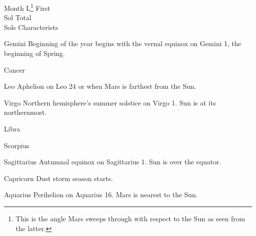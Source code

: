 {
    \bTABLE[split=repeat,option=stretch]
    \setupTABLE[column][5]
        [width=.52\textwidth,
        align=yes]
    \setupTABLE[row][each][align=center]
    \setupTABLE[5][1][align=center]

\bTABLEhead
    \bTR[bottomframe=on]
      \bTH  Month \eTH
      \bTH  L\footnote{This is the angle Mars sweeps through with respect to the Sun as seen from the latter.} \eTH
      \bTH  First\\Sol \eTH
      \bTH  Total\\Sols \eTH
      \bTH  Characterists \eTH
    \eTR
\eTABLEhead

\bTABLEbody
    \bTR
      \bTC Gemini \eTC
      \bTC \math{[0^{\circ}, 30^{\circ})}\eTC
       \eTC
       \eTC
      \bTC Beginning of the year begins with the vernal equinox on Gemini 1, the beginning of Spring.\eTC
    \eTR
    
    \bTR
      \bTC Cancer \eTC
      \bTC \math{[30^{\circ}, 60^{\circ})} \eTC
       \eTC
       \eTC
      \bTC  \eTC
    \eTR
    
    \bTR
      \bTC Leo \eTC
      \bTC \math{[60^{\circ}, 90^{\circ})} \eTC
       \eTC
       \eTC
      \bTC Aphelion on Leo 24 or when Mars is farthest from the Sun.\eTC
    \eTR
    
    \bTR
      \bTC Virgo \eTC
      \bTC \math{[90^{\circ}, 120^{\circ})} \eTC
       \eTC
       \eTC
      \bTC Northern hemisphere's summer solstice on Virgo 1. Sun is at its northernmost.\eTC
    \eTR
    
    \bTR
      \bTC Libra \eTC
      \bTC \math{[120^{\circ}, 150^{\circ})} \eTC
       \eTC
       \eTC
      \bTC  \eTC
    \eTR
    
    \bTR
      \bTC Scorpius \eTC
      \bTC \math{[150^{\circ}, 180^{\circ})} \eTC
       \eTC
       \eTC
      \bTC  \eTC
    \eTR
    
    \bTR
      \bTC Sagittarius \eTC
      \bTC \math{[180^{\circ}, 210^{\circ})} \eTC
       \eTC
       \eTC
      \bTC Autumnal equinox on Sagittarius 1. Sun is over the equator.\eTC
    \eTR
    
    \bTR
      \bTC Capricorn \eTC
      \bTC \math{[210^{\circ}, 240^{\circ})} \eTC
       \eTC
       \eTC
      \bTC Dust storm season starts. \eTC
    \eTR
    
    \bTR
      \bTC Aquarius \eTC
      \bTC \math{[240^{\circ}, 270^{\circ})} \eTC
       \eTC
       \eTC
      \bTC Perihelion on Aquarius 16. Mars is nearest to the Sun.\eTC
    \eTR
    
}
